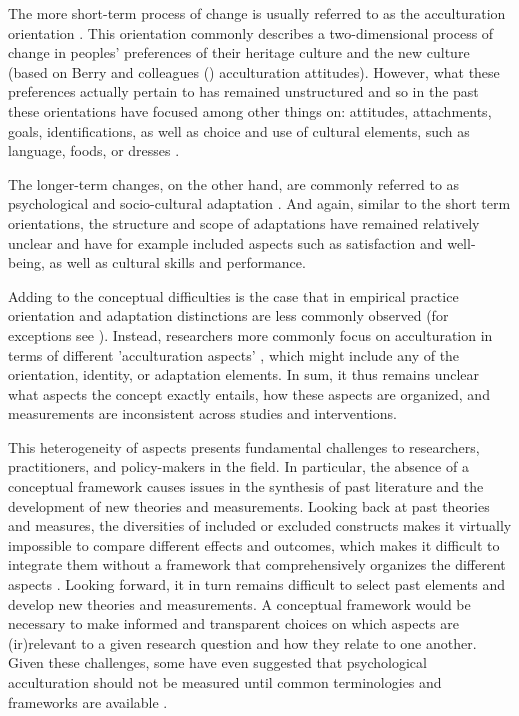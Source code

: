 \documentclass[man, 12pt, a4paper]{apa7}
\begin{document}
The more short-term process of change is usually referred to as the acculturation orientation \citep[e.g.,][]{Ward2001, Berry2003}. This orientation commonly describes a two-dimensional process of change in peoples' preferences of their heritage culture and the new culture (based on Berry and colleagues (\citeyear{Berry1997b, Berry2003}) acculturation attitudes). However, what these preferences actually pertain to has remained unstructured and so in the past these orientations have focused among other things on: attitudes, attachments, goals, identifications, as well as choice and use of cultural elements, such as language, foods, or dresses \citep[e.g.,][]{Rudmin2003a}. 

The longer-term changes, on the other hand, are commonly referred to as psychological and socio-cultural adaptation \citep{Searle1990, Ward2001, Berry2003}. And again, similar to the short term orientations, the structure and scope of adaptations have remained relatively unclear and have for example included aspects such as satisfaction and well-being, as well as cultural skills and performance. 

Adding to the conceptual difficulties is the case that in empirical practice orientation and adaptation distinctions are less commonly observed (for exceptions see \citealp{ICSEYteam2006, Berry2006b, TeLindert2008a}). Instead, researchers more commonly focus on acculturation in terms of different 'acculturation aspects' \citep{Arends-Toth2006a}, which might include any of the orientation, identity, or adaptation elements. In sum, it thus remains unclear what aspects the concept exactly entails, how these aspects are organized, and measurements are inconsistent across studies and interventions.

This heterogeneity of aspects presents fundamental challenges to researchers, practitioners, and policy-makers in the field. In particular, the absence of a conceptual framework causes issues in the synthesis of past literature and the development of new theories and measurements.
Looking back at past theories and measures, the diversities of included or excluded constructs makes it virtually impossible to compare different effects and outcomes, which makes it difficult to integrate them without a framework that comprehensively organizes the different aspects \citep{Taft1981}.
Looking forward, it in turn remains difficult to select past elements and develop new theories and measurements. A conceptual framework would be necessary to make informed and transparent choices on which aspects are (ir)relevant to a given research question and how they relate to one another.
Given these challenges, some have even suggested that psychological acculturation should not be measured until common terminologies and frameworks are available \citep{Escobar2000}.
\end{document}
